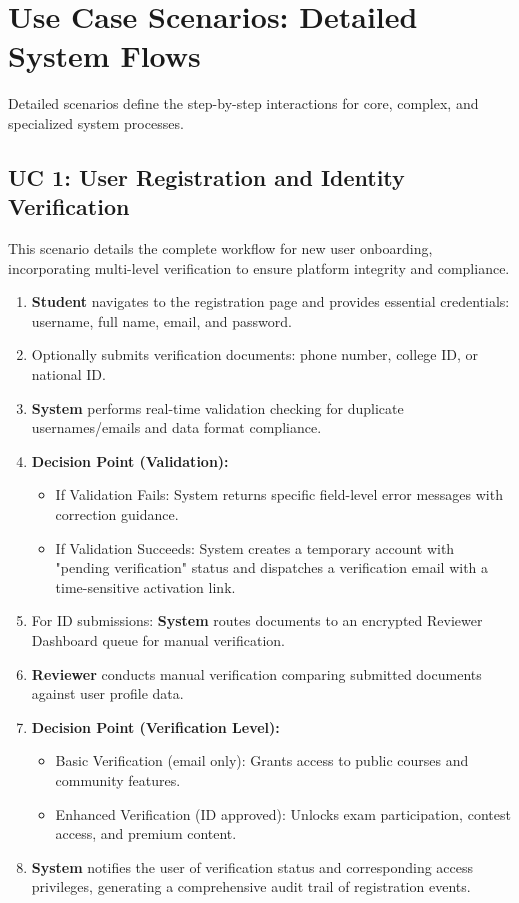 \section{Use Case Scenarios: Detailed System Flows}
\label{sec:use_case_scenarios}
Detailed scenarios define the step-by-step interactions for core, complex, and specialized system processes.

\subsection{UC 1: User Registration and Identity Verification}
\label{subsec:uc1}
This scenario details the complete workflow for new user onboarding, incorporating multi-level verification to ensure platform integrity and compliance.
\begin{enumerate}
    \item \textbf{Student} navigates to the registration page and provides essential credentials: username, full name, email, and password.
    \item Optionally submits verification documents: phone number, college ID, or national ID.
    \item \textbf{System} performs real-time validation checking for duplicate usernames/emails and data format compliance.
    \item \textbf{Decision Point (Validation):}
    \begin{itemize}
        \item If Validation Fails: System returns specific field-level error messages with correction guidance.
        \item If Validation Succeeds: System creates a temporary account with "pending verification" status and dispatches a verification email with a time-sensitive activation link.
    \end{itemize}
    \item For ID submissions: \textbf{System} routes documents to an encrypted Reviewer Dashboard queue for manual verification.
    \item \textbf{Reviewer} conducts manual verification comparing submitted documents against user profile data.
    \item \textbf{Decision Point (Verification Level):}
    \begin{itemize}
        \item Basic Verification (email only): Grants access to public courses and community features.
        \item Enhanced Verification (ID approved): Unlocks exam participation, contest access, and premium content.
    \end{itemize}
    \item \textbf{System} notifies the user of verification status and corresponding access privileges, generating a comprehensive audit trail of registration events.
\end{enumerate}

